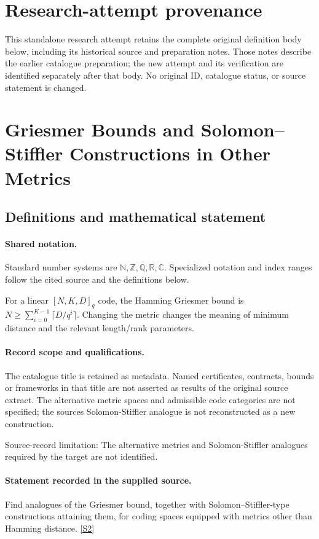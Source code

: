 \documentclass[11pt]{article}
\begin{document}
\section*{Research-attempt provenance}
This standalone research attempt retains the complete original definition body below,
including its historical source and preparation notes. Those notes describe the
earlier catalogue preparation; the new attempt and its verification are identified
separately after that body. No original ID, catalogue status, or source statement is changed.

\section{Griesmer Bounds and Solomon–Stiffler Constructions in Other Metrics}\label{statement}

\subsection{Definitions and mathematical statement}

\paragraph{Shared notation.}Standard number systems are $\mathbb N,\mathbb Z,\mathbb Q,\mathbb R,\mathbb C$. Specialized notation and index ranges follow the cited source and the definitions below.


For a linear $[N,K,D]_q$ code, the Hamming Griesmer bound is $N\geq\sum_{i=0}^{K-1}\lceil D/q^i\rceil$. Changing the metric changes the meaning of minimum distance and the relevant length/rank parameters.
\paragraph{Record scope and qualifications.}
The catalogue title is retained as metadata. Named certificates, contracts, bounds or frameworks in that title are not asserted as results of the original source extract.
The alternative metric spaces and admissible code categories are not specified; the source\textquotesingle s Solomon-Stiffler analogue is not reconstructed as a new construction.

Source-record limitation: The alternative metrics and Solomon-Stiffler analogues required by the target are not identified.
\paragraph{Statement recorded in the supplied source.}
Find analogues of the Griesmer bound, together with Solomon–Stiffler-type constructions attaining them, for coding spaces equipped with metrics other than Hamming distance. \href{https://doi.org/10.4171/owr/2025/41}{[S2]}
\end{document}
